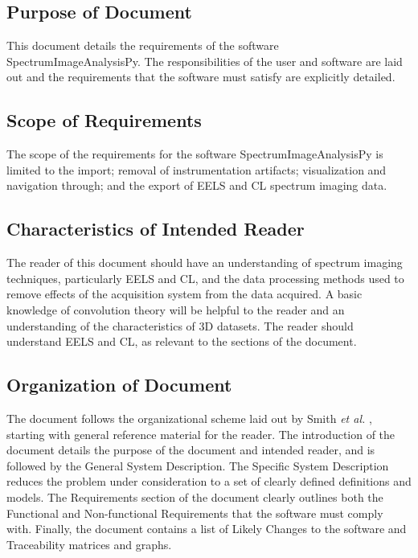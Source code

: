 \documentclass[12pt]{article}
\newcommand{\progname}{SpectrumImageAnalysisPy} %
\begin{document}
\subsection{Purpose of Document}

This document details the requirements of the software \progname{}. The responsibilities of the user and software are laid out and the requirements that the software must satisfy are explicitly detailed.

\subsection{Scope of Requirements} 
The scope of the requirements for the software \progname{} is limited to the import; removal of instrumentation artifacts; visualization and navigation through; and the export of EELS and CL spectrum imaging data.

\subsection{Characteristics of Intended Reader} 
The reader of this document should have an understanding of spectrum imaging techniques, particularly EELS and CL, and the data processing methods used to remove effects of the acquisition system from the data acquired. A basic knowledge of convolution theory will be helpful to the reader and an understanding of the characteristics of 3D datasets. The reader should understand EELS and CL, as relevant to the sections of the document.

\subsection{Organization of Document}

The document follows the organizational scheme laid out by Smith \textit{et al.} \cite{SmithAndLai2005, smith_requirements_2007}, starting with general reference material for the reader. The introduction of the document details the purpose of the document and intended reader, and is followed by the General System Description. The Specific System Description reduces the problem under consideration to a set of clearly defined definitions and models. The Requirements section of the document clearly outlines both the Functional and Non-functional Requirements that the software must comply with. Finally, the document contains a list of Likely Changes to the software and Traceability matrices and graphs.
\end{document}
